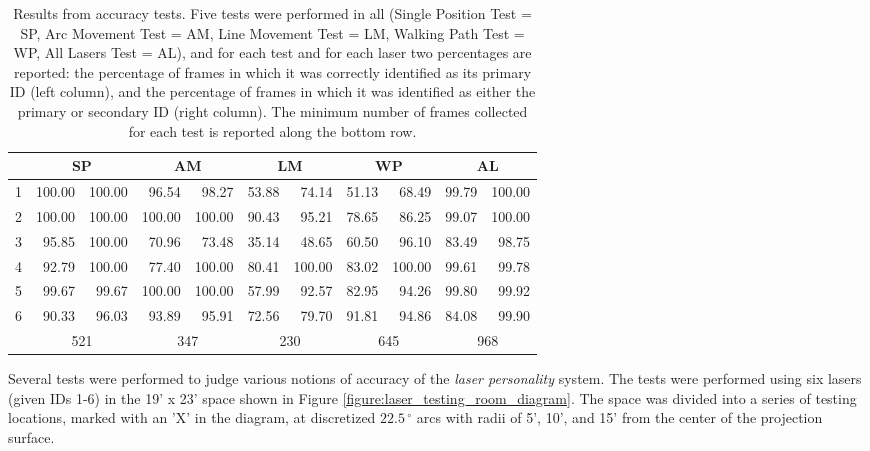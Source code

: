 \begin{center}
\begin{table} [t]
\centering
\caption[Laser personality accuracy testing data]{\label{table:AccuracyTestingResults}Results from accuracy
  tests. Five tests were performed in all (Single Position Test = SP, Arc Movement Test = AM, Line Movement Test = LM, Walking Path Test = WP, All Lasers Test = AL), and for each test and for
  each laser two percentages are reported: the percentage of frames in
  which it was correctly identified as its primary ID (left column), and the
  percentage of frames in which it was identified as either the primary or secondary
  ID (right column). The minimum number of frames collected for each test is reported
  along the bottom row. 
  }
\begin{small}
\begin{tabular}{ | c | r | r | r | r | r | r | r | r | r | r | }
 \hline
 \textbf{} & \multicolumn{2}{|c|}{\textbf{SP}} & \multicolumn{2}{|c|}{\textbf{AM}} & \multicolumn{2}{|c|}{\textbf{LM}} & \multicolumn{2}{|c|}{\textbf{WP}} & \multicolumn{2}{|c|}{\textbf{AL}} \\
 \hline
  1 & 100.00 & 100.00& 96.54 & 98.27 & 53.88 & 74.14 & 51.13 & 68.49 & 99.79 & 100.00 \\
  2 & 100.00 & 100.00 & 100.00 & 100.00 & 90.43 & 95.21 & 78.65 & 86.25 & 99.07 & 100.00 \\
  3 & 95.85 & 100.00 & 70.96 & 73.48 & 35.14 & 48.65 & 60.50 & 96.10 & 83.49 & 98.75 \\
  4 & 92.79 & 100.00 & 77.40 & 100.00 & 80.41 & 100.00 & 83.02 & 100.00 & 99.61 & 99.78 \\
  5 & 99.67 & 99.67 & 100.00 & 100.00 & 57.99 & 92.57 & 82.95 & 94.26 & 99.80 & 99.92 \\
  6 & 90.33 & 96.03 & 93.89 & 95.91 & 72.56 & 79.70 & 91.81 & 94.86 & 84.08 & 99.90 \\
  \hline
  \textbf{} & \multicolumn{2}{|c|}{521} & \multicolumn{2}{|c|}{347} & \multicolumn{2}{|c|}{230} & \multicolumn{2}{|c|}{645} & \multicolumn{2}{|c|}{968} \\
 \hline  
\end{tabular}
\end{small}
\end{table}
\end{center}

Several tests were performed to judge various notions of accuracy of the
\emph{laser personality} system. The tests were performed using six
lasers (given IDs 1-6) in the 19' x 23' space shown in Figure
\ref{figure:laser_testing_room_diagram}. The space was divided into a
series of testing locations, marked with an 'X' in the diagram, at
discretized $22.5\,^{\circ}$ arcs with radii of 5', 10', and 15' from
the center of the projection surface.

